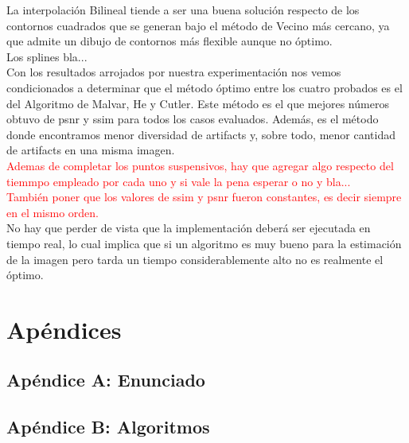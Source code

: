 \documentclass[a4paper]{article}
\begin{document}
La interpolaci\'on Bilineal tiende a ser una buena soluci\'on respecto de los contornos cuadrados que se generan bajo el m\'etodo de Vecino m\'as cercano, ya que admite un dibujo de contornos m\'as flexible aunque no \'optimo.\\

Los splines bla...\\

Con los resultados arrojados por nuestra experimentaci\'on nos vemos condicionados a determinar que el m\'etodo \'optimo entre los cuatro probados es el del Algoritmo de Malvar, He y Cutler. Este m\'etodo es el que mejores n\'umeros obtuvo de psnr y ssim para todos los casos evaluados. Adem\'as, es el m\'etodo donde encontramos menor diversidad de artifacts y, sobre todo, menor cantidad de artifacts en una misma imagen. \\

\textcolor{red}{Ademas de completar los puntos suspensivos, hay que agregar algo respecto del tiemmpo empleado por cada uno y si vale la pena esperar o no y bla...\\
Tambi\'en poner que los valores de ssim y psnr fueron constantes, es decir siempre en el mismo orden.}\\

No hay que perder de vista que la implementaci\'on deber\'a ser ejecutada en tiempo real, lo cual implica que si un algoritmo es muy bueno para la estimaci\'on de la imagen pero tarda un tiempo considerablemente alto no es realmente el \'optimo.




\section{Ap\'endices}
\subsection{Ap\'endice A: Enunciado} 




\subsection{Ap\'endice B: Algoritmos}
\end{document}
